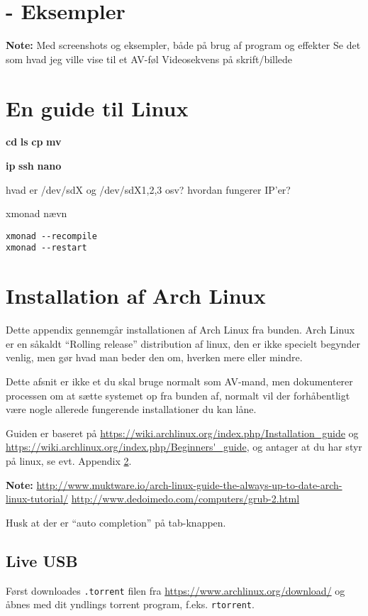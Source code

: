 \documentclass[10pt,a4paper,danish]{article}
\newcommand{\note}[1]{\begin{mdframed}[style=note]\textbf{Note:}
    #1\end{mdframed}}
\begin{document}
\section{- Eksempler}
\note{Med screenshots og eksempler, både på brug af program og effekter
  Se det som hvad jeg ville vise til et AV-føl
  Videosekvens på skrift/billede
}

\appendix
\section{En guide til Linux}
\label{linux_guide}
\textbf{cd}
\textbf{ls}
\textbf{cp}
\textbf{mv}

\textbf{ip}
\textbf{ssh}
\textbf{nano}

hvad er /dev/sdX og /dev/sdX1,2,3 osv?
hvordan fungerer IP'er?

xmonad
nævn
\begin{verbatim}
xmonad --recompile
xmonad --restart
\end{verbatim}
\newpage
\section{Installation af Arch Linux}
Dette appendix gennemgår installationen af Arch Linux fra bunden.
Arch Linux er en såkaldt ``Rolling release'' distribution af linux, den er ikke
specielt begynder venlig, men gør hvad man beder den om, hverken mere eller
mindre.

Dette afsnit er ikke et du skal bruge normalt som AV-mand, men dokumenterer
processen om at sætte systemet op fra bunden af, normalt vil der forhåbentligt
være nogle allerede fungerende installationer du kan låne.

Guiden er baseret på
\url{https://wiki.archlinux.org/index.php/Installation_guide} og\\
\url{https://wiki.archlinux.org/index.php/Beginners'_guide}, og antager at du
har styr på linux, se evt. Appendix \ref{linux_guide}.
\note{\url{http://www.muktware.io/arch-linux-guide-the-always-up-to-date-arch-linux-tutorial/} \url{http://www.dedoimedo.com/computers/grub-2.html}}
Husk at der er ``auto completion'' på tab-knappen.

\subsection{Live USB}
Først downloades \texttt{.torrent} filen fra
\url{https://www.archlinux.org/download/} og åbnes med dit yndlings torrent
program, f.eks. \texttt{rtorrent}.
\end{document}
